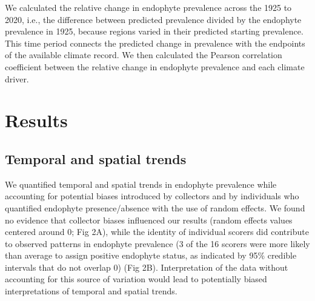 \documentclass[11pt]{article}
\begin{document}
We calculated the relative change in endophyte prevalence across the 1925 to 2020, i.e., the difference between predicted prevalence divided by the endophyte prevalence in 1925, because regions varied in their predicted starting prevalence. 
This time period connects the predicted change in prevalence with the endpoints of the available climate record.
We then calculated the Pearson correlation coefficient between the relative change in endophyte prevalence and each climate driver.



		
\section*{Results}
\subsection*{Temporal and spatial trends}
We quantified temporal and spatial trends in endophyte prevalence while accounting for potential biases introduced by collectors and by individuals who quantified endophyte presence/absence with the use of random effects. We found no evidence that collector biases influenced our results (random effects values centered around 0; Fig 2A), while the identity of individual scorers did contribute to observed patterns in endophyte prevalence (3 of the 16 scorers were more likely than average to assign positive endophyte status, as indicated by 95\% credible intervals that do not overlap 0) (Fig 2B). Interpretation of the data without accounting for this source of variation would lead to potentially biased interpretations of temporal and spatial trends.
\end{document}
